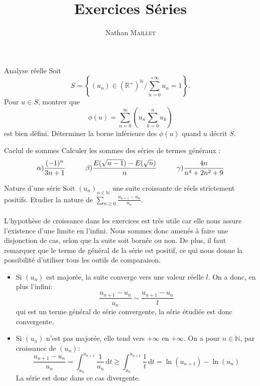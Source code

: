 \documentclass[french, a4paper, 11pt]{article}
\title{Exercices Séries}
\author{Nathan \textsc{Maillet}}
\date{}
\newcommand{\N}{\mathbb{N}}   %
\newcommand{\R}{\mathbb{R}}   %
\newcommand{\po}{\left(}         %
\newcommand{\pf}{\right)}        %
\newcommand{\pof}[1]{\po #1 \pf} %
\begin{document}
\maketitle
\begin{cadre}{Analyse réelle}
    Soit \[S=\left\{(u_n)\in (\R^+)^{\N} / \sum_{n=0}^{+\infty}u_n=1\right\}.\]
    Pour \(u \in S\), montrer que
      \[\phi(u)=\sum_{n=0}^{\infty}\pof{u_n\sum_{k=0}^n u_k} \]
      est bien défini. Déterminer la borne inférieure des \(\phi(u)\) quand $u$ décrit $S$.
\end{cadre}

\begin{cadre}{Caclul de sommes}
  Calculer les sommes des séries de termes généraux :
  \[\alpha)\frac{(-1)^n}{3n+1} \hspace*{1cm} \beta)\frac{E(\sqrt{n-1})-E(\sqrt{n})}{n} \hspace*{1cm} \gamma)\frac{4n}{n^4+2n^2+9}\]
\end{cadre}

\begin{cadre}{Nature d'une série}
Soit $(u_{n})_{n \in \N} $ une suite croissante de réels strictement positifs. Etudier la nature de $\sum_{n \ge 0}^{} \frac{u_{n+1}-u_{n}}{u_{n}}$.
\tcblower
\paragraph*{}
L'hypothèse de croissance dans les exercices est très utile car elle nous assure l'existence d'une limite en l'infini. Nous sommes donc amenés à faire une disjonction de cas, selon que la suite soit bornée ou non. De plus, il faut remarquer que le terme de général de la série est positif, ce qui nous donne la possibilité d'utiliser tous les outils de comparaison.

\begin{itemize}[label=$\bullet$]
\item Si $(u_n)$ est majorée, la suite converge vers une valeur réelle $l$. On a donc, en plus l'infini:
\[\dfrac{u_{n+1}-u_{n}}{u_{n}}\sim \dfrac{u_{n+1}-u_{n}}{l}\] qui est un terme général de série convergente, la série étudiée est donc convergente.

\item Si $(u_n)$ n'est pas majorée, elle tend vers $+\infty$ en $+\infty$. On a pour $n \in \N$, par croissance de $(u_n)$:
    \[
    \dfrac{u_{n+1}-u_{n}}{u_{n}}=\displaystyle \int_{u_n}^{u_{n+1}} \dfrac{1}{u_n} \, \mathrm{d}t \ge \displaystyle \int_{u_n}^{u_{n+1}} \dfrac{1}{t} \, \mathrm{d}t =\ln(u_{n+1})-\ln(u_n)
    \]
La série est donc dans ce cas divergente.
\end{itemize}
\end{cadre}
\end{document}
